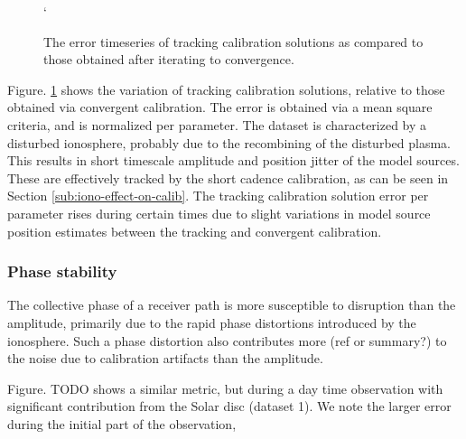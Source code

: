 \documentclass{aa}
\begin{document}
\begin{figure}[tbh]
`\caption{\label{fig:The-error-timeseries}The error timeseries of tracking
calibration solutions as compared to those obtained after iterating
to convergence. }
\end{figure}


Figure. \ref{fig:The-error-timeseries} shows the variation of tracking
calibration solutions, relative to those obtained via convergent calibration.
The error is obtained via a mean square criteria, and is normalized
per parameter. The dataset is characterized by a disturbed ionosphere,
probably due to the recombining of the disturbed plasma. This results
in short timescale amplitude and position jitter of the model sources.
These are effectively tracked by the short cadence calibration, as
can be seen in Section \ref{sub:iono-effect-on-calib}. The tracking
calibration solution error per parameter rises during certain times
due to slight variations in model source position estimates between
the tracking and convergent calibration.


\subsubsection{Phase stability}

The collective phase of a receiver path is more susceptible to disruption
than the amplitude, primarily due to the rapid phase distortions introduced
by the ionosphere. Such a phase distortion also contributes more (ref
or summary?) to the noise due to calibration artifacts than the amplitude.

Figure. TODO shows a similar metric, but during a day time observation
with significant contribution from the Solar disc (dataset 1). We
note the larger error during the initial part of the observation, 
\end{document}
